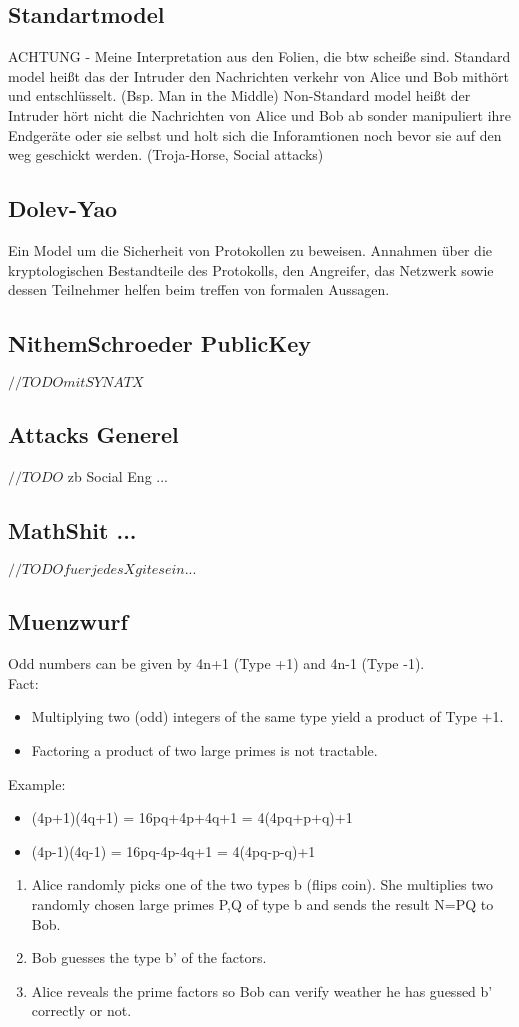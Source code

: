 \documentclass[a4paper, 12pt]{article}
\begin{document}
\subsection{Standartmodel}
ACHTUNG - Meine Interpretation aus den Folien, die btw scheiße sind.
Standard model heißt das der Intruder den Nachrichten verkehr von Alice und Bob mithört und entschlüsselt. (Bsp. Man in the Middle)
Non-Standard model heißt der Intruder hört nicht die Nachrichten von Alice und Bob ab sonder manipuliert ihre Endgeräte oder sie selbst und holt sich die Inforamtionen noch bevor sie auf den weg geschickt werden. (Troja-Horse, Social attacks)
\subsection{Dolev-Yao}
Ein Model um die Sicherheit von Protokollen zu beweisen. Annahmen über die kryptologischen Bestandteile des Protokolls, den Angreifer, das Netzwerk sowie dessen Teilnehmer helfen beim treffen von formalen Aussagen.
\subsection{NithemSchroeder PublicKey}
$ //TODO mit SYNATX $
\subsection{Attacks Generel}
$ //TODO $
zb Social Eng ...
\subsection{MathShit ...}
$ //TODO fuer jedes X git es ein ... $
\subsection{Muenzwurf}
Odd numbers can be given by 4n+1 (Type +1) and 4n-1 (Type -1).\\
Fact:
\begin{itemize}
\item Multiplying two (odd) integers of the same type yield a product of Type +1.
\item Factoring a product of two large primes is not tractable.
\end{itemize}
Example:
\begin{itemize}
\item (4p+1)(4q+1) = 16pq+4p+4q+1 = 4(4pq+p+q)+1
\item (4p-1)(4q-1) = 16pq-4p-4q+1 = 4(4pq-p-q)+1
\end{itemize}
\begin{enumerate}
\item Alice randomly picks one of the two types b (flips coin). She multiplies two randomly chosen large primes P,Q of type b and sends the result N=PQ to Bob.\\
\item Bob guesses the type b' of the factors.\\
\item Alice reveals the prime factors so Bob can verify weather he has guessed b' correctly or not.
\end{enumerate}
\end{document}
